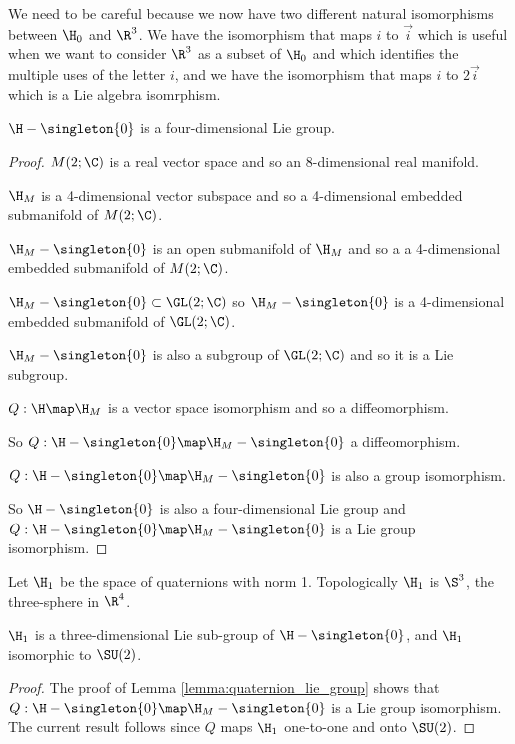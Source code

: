 \documentclass[oneside,12pt]{amsart}
\begin{document}
\begin{remark}
We need to be careful because we now have two different natural isomorphisms between $\H_0$ and $\R^{3}$.
We have the isomorphism that maps $i$ to $\vec{i}$ which is useful when we want to consider $\R^3$ as a subset of
$\H_0$ and which identifies the multiple
uses of the letter $i$, and we have the isomorphism that maps $i$ to $2\vec{i}$ which is a Lie algebra isomrphism.
\end{remark}

\begin{lemma}
\label{lemma:quaternion_lie_group}
$\H -\singleton{0}$ is a four-dimensional Lie group.
\end{lemma}
\begin{proof}
$M(2; \C)$ is a real vector space and so an 8-dimensional real manifold. 

$\H_M$ is a 4-dimensional vector subspace and so a 4-dimensional embedded submanifold of $M(2; \C)$.

$\H_M- \singleton{0}$ is an open submanifold of $\H_M$ and so a a 4-dimensional embedded submanifold of $M(2; \C)$.


$\H_M- \singleton{0}\subset \GL(2;\C)$ so $\H_M- \singleton{0}$ is a 4-dimensional embedded submanifold of $\GL(2;\C)$.


$\H_M- \singleton{0}$ is also a subgroup of $\GL(2;\C)$ and so it is a Lie subgroup.

$Q:\H\map\H_M$ is a vector space isomorphism and so a diffeomorphism.

So $Q:\H - \singleton{0}\map\H_M- \singleton{0}$ a diffeomorphism.

$Q:\H- \singleton{0}\map\H_M- \singleton{0}$ is also a group isomorphism.

So $\H - \singleton{0}$ is also a four-dimensional Lie group and $Q:\H-\singleton{0}\map\H_M-\singleton{0}$
 is a Lie group isomorphism.
\end{proof}


\begin{definition}
Let $\H_1$ be the space of quaternions with norm 1. Topologically $\H_1$ is $\S^3$, the three-sphere in $\R^4$.
\end{definition}

\begin{corollary}
\label{corollary:h_1_lie_subgroup}
$\H_1$ is a three-dimensional Lie sub-group of $\H-\singleton{0}$, and $\H_1$ isomorphic to $\SU(2)$.
\end{corollary}
\begin{proof}
The proof of Lemma \ref{lemma:quaternion_lie_group} shows that $Q:\H-\singleton{0}\map\H_M-\singleton{0}$
is a Lie group isomorphism. The current result follows since
$Q$ maps $\H_1$ one-to-one and onto $\SU(2)$.
\end{proof}
\end{document}
